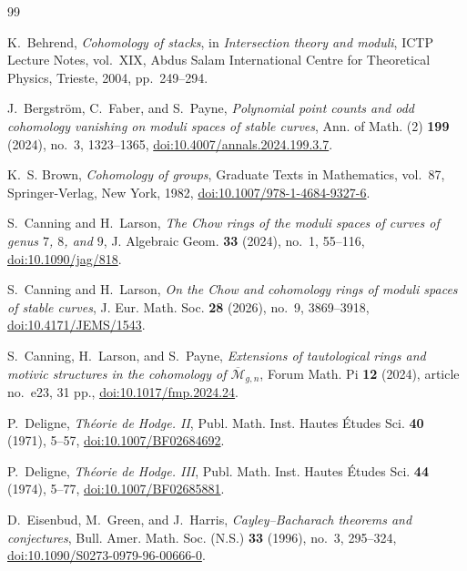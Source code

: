 \documentclass[12pt,reqno]{amsart}
\theoremstyle{definition}
\theoremstyle{remark}
\begin{document}
\begin{thebibliography}{99}

K.~Behrend,
\emph{Cohomology of stacks},
in \emph{Intersection theory and moduli}, ICTP Lecture Notes, vol.~XIX,
Abdus Salam International Centre for Theoretical Physics, Trieste, 2004,
pp.~249--294.

J.~Bergstr\"om, C.~Faber, and S.~Payne,
\emph{Polynomial point counts and odd cohomology vanishing on moduli spaces
of stable curves},
Ann. of Math. (2) \textbf{199} (2024), no.~3, 1323--1365,
\href{https://doi.org/10.4007/annals.2024.199.3.7}
{doi:10.4007/annals.2024.199.3.7}.

K.~S. Brown,
\emph{Cohomology of groups},
Graduate Texts in Mathematics, vol.~87, Springer-Verlag, New York, 1982,
\href{https://doi.org/10.1007/978-1-4684-9327-6}
{doi:10.1007/978-1-4684-9327-6}.

S.~Canning and H.~Larson,
\emph{The Chow rings of the moduli spaces of curves of genus $7$, $8$, and
$9$},
J. Algebraic Geom. \textbf{33} (2024), no.~1, 55--116,
\href{https://doi.org/10.1090/jag/818}{doi:10.1090/jag/818}.

S.~Canning and H.~Larson,
\emph{On the Chow and cohomology rings of moduli spaces of stable curves},
J. Eur. Math. Soc. \textbf{28} (2026), no.~9, 3869--3918,
\href{https://doi.org/10.4171/JEMS/1543}{doi:10.4171/JEMS/1543}.

S.~Canning, H.~Larson, and S.~Payne,
\emph{Extensions of tautological rings and motivic structures in the
cohomology of $\overline{\mathcal M}_{g,n}$},
Forum Math. Pi \textbf{12} (2024), article no.~e23, 31 pp.,
\href{https://doi.org/10.1017/fmp.2024.24}{doi:10.1017/fmp.2024.24}.

P.~Deligne,
\emph{Th\'eorie de Hodge. II},
Publ. Math. Inst. Hautes \'Etudes Sci. \textbf{40} (1971), 5--57,
\href{https://doi.org/10.1007/BF02684692}{doi:10.1007/BF02684692}.

P.~Deligne,
\emph{Th\'eorie de Hodge. III},
Publ. Math. Inst. Hautes \'Etudes Sci. \textbf{44} (1974), 5--77,
\href{https://doi.org/10.1007/BF02685881}{doi:10.1007/BF02685881}.

D.~Eisenbud, M.~Green, and J.~Harris,
\emph{Cayley--Bacharach theorems and conjectures},
Bull. Amer. Math. Soc. (N.S.) \textbf{33} (1996), no.~3, 295--324,
\href{https://doi.org/10.1090/S0273-0979-96-00666-0}
{doi:10.1090/S0273-0979-96-00666-0}.


\end{thebibliography}
\end{document}
